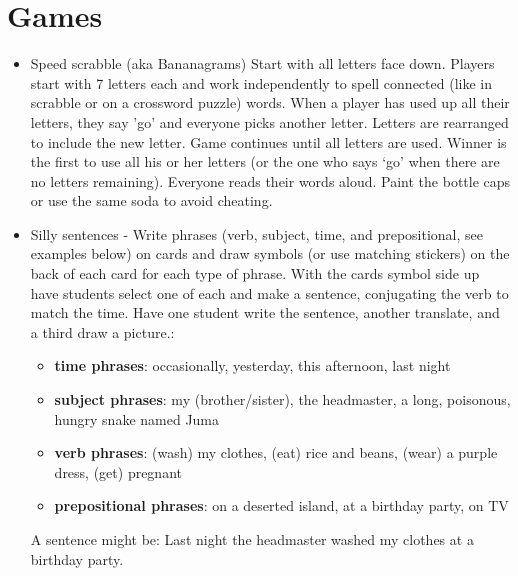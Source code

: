 \section{Games}
\begin{itemize}
\item Speed scrabble (aka Bananagrams) Start with all letters face down.
Players start with 7 letters each and work independently to spell
connected (like in scrabble or on a crossword puzzle) words. When
a player has used up all their letters, they say 'go' and everyone
picks another letter. Letters are rearranged to include the new letter.
Game continues until all letters are used. Winner is the first to
use all his or her letters (or the one who says `go' when there are
no letters remaining). Everyone reads their words aloud. Paint the
bottle caps or use the same soda to avoid cheating.  
\item Silly sentences - Write phrases (verb, subject, time, and prepositional,
see examples below) on cards and draw symbols (or use matching stickers)
on the back of each card for each type of phrase. With the cards symbol
side up have students select one of each and make a sentence, conjugating
the verb to match the time. Have one student write the sentence, another
translate, and a third draw a picture.: 

\begin{itemize}
\item \textbf{time phrases}: occasionally, yesterday, this afternoon, last
night 
\item \textbf{subject phrases}: my (brother/sister), the headmaster, a long,
poisonous, hungry snake named Juma  
\item \textbf{verb phrases}: (wash) my clothes, (eat) rice and beans, (wear)
a purple dress, (get) pregnant  
\item \textbf{prepositional phrases}: on a deserted island, at a birthday
party, on TV 
\end{itemize}

A sentence might be: Last night the headmaster washed my clothes at
a birthday party. 

\end{itemize}

